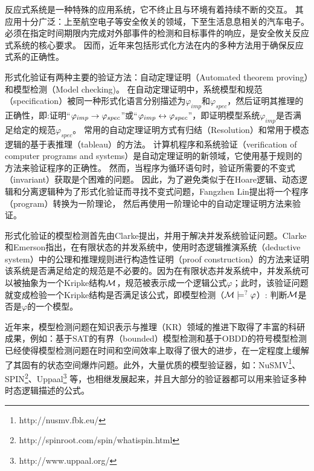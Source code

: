 反应式系统是一种特殊的应用系统，它不终止且与环境有着持续不断的交互。
其应用十分广泛：上至航空电子等安全攸关的领域，下至生活息息相关的汽车电子。
必须在指定时间期限内完成对外部事件的检测和目标事件的响应，是安全攸关反应式系统的核心要求。
因而，近年来包括形式化方法在内的多种方法用于确保反应式系的正确性。


形式化验证有两种主要的验证方法：自动定理证明（Automated theorem proving）和模型检测（Model checking)。
在自动定理证明中，系统模型和规范（specification）被同一种形式化语言分别描述为$\varphi_{imp}$和$\varphi_{spec}$，然后证明其推理的正确性，即:证明“$\varphi_{imp}\rightarrow \varphi_{spec}$”或“$\varphi_{imp}\leftrightarrow\varphi_{spec}$”，即证明模型系统$\varphi_{imp}$是否满足给定的规范$\varphi_{spec}$。
常用的自动定理证明方式有归结（Resolution）\cite{DBLP:journals/jacm/Robinson65}和常用于模态逻辑的基于表推理（tableau）\cite{hughes1996new}的方法。
计算机程序和系统验证（verification of computer programs and systems）是自动定理证明的新领域，它使用基于规则的方法来验证程序的正确性。
然而，当程序为循环语句时，验证所需要的不变式（invariant）获取是个困难的问题。
因此，为了避免类似于在Hoare逻辑\cite{Hoare1969}、动态逻辑\cite{harel1979first}和分离逻辑\cite{DBLP:conf/lics/Reynolds02}种为了形式化验证而寻找不变式问题，Fangzhen Lin提出将一个程序（program）转换为一阶理论，
然后再使用一阶理论中的自动定理证明方法来验证\cite{DBLP:journals/ai/Lin16}。

形式化验证的模型检测首先由Clarke提出，并用于解决并发系统验证问题\cite{DBLP:conf/spin/Clarke08}。Clarke和Emerson指出，在有限状态的并发系统中，使用时态逻辑推演系统（deductive system）中的公理和推理规则进行构造性证明（proof construction）的方法来证明该系统是否满足给定的规范是不必要的\cite{clarke1981design}。因为在有限状态并发系统中，并发系统可以被抽象为一个Kripke结构${\cal M}$，规范被表示成一个逻辑公式$\varphi$；此时，该验证问题就变成检验一个Kripke结构是否满足该公式，即模型检测（${\cal M}\models^? \varphi$）: 判断${\cal M}$是否是$\varphi$的一个模型。

近年来，模型检测问题在知识表示与推理（KR）领域的推进下取得了丰富的科研成果，例如：基于SAT的有界（bounded）模型检测\cite{DBLP:journals/ac/BiereCCSZ03}和基于OBDD的符号模型检测\cite{burch1992symbolic}已经使得模型检测问题在时间和空间效率上取得了很大的进步，在一定程度上缓解了其固有的状态空间爆炸问题。此外，大量优质的模型验证器，如：NuSMV\footnote{http://nusmv.fbk.eu/}、SPIN\footnote{http://spinroot.com/spin/whatispin.html}、Uppaal\footnote{http://www.uppaal.org/} 等，也相继发展起来，并且大部分的验证器都可以用来验证多种时态逻辑描述的公式。  

